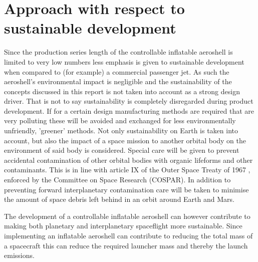 \section{Approach with respect to sustainable development}
\label{ch:sustain}



Since the production series length of the controllable inflatable aeroshell is limited to very low numbers less emphasis is given to sustainable development when compared to (for example) a commercial passenger jet. As such the aeroshell's environmental impact is negligible and the sustainability of the concepts discussed in this report is not taken into account as a strong design driver. That is not to say sustainability is completely disregarded during product development. If for a certain design manufacturing methods are required that are very polluting these will be avoided and exchanged for less environmentally unfriendly, 'greener' methods. 
Not only sustainability on Earth is taken into account, but also the impact of a space mission to another orbital body on the environment of said body is considered. Special care will be given to prevent accidental contamination of other orbital bodies with organic lifeforms and other contaminants. This is in line with article IX of the Outer Space Treaty of 1967 \cite{UnitedNations2008}, enforced by the Committee on Space Research (COSPAR). In addition to preventing forward interplanetary contamination care will be taken to minimise the amount of space debris left behind in an orbit around Earth and Mars. 

The development of a controllable inflatable aeroshell can however contribute to making both planetary and interplanetary spaceflight more sustainable. Since implementing an inflatable aeroshell can contribute to reducing the total mass of a spacecraft this can reduce the required launcher mass and thereby the launch emissions.

